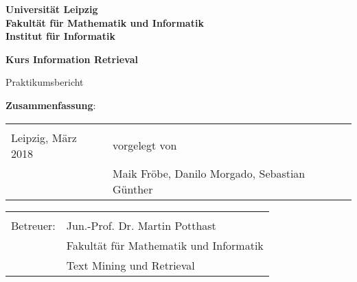 \documentclass[a4paper,ngerman,twoside,BCOR1.5cm,headsepline,DIV12,appendixprefix,final,12pt]{scrartcl}
\begin{document}
\thispagestyle{empty}

\begin{center}
\large

\vspace{1cm}
\textbf{\sffamily	Universität Leipzig\\
			Fakultät für Mathematik und Informatik\\
			Institut für Informatik\\}

\vspace{2cm}
{\Large\textbf{\sffamily Kurs Information Retrieval}}


\large

Praktikumsbericht
\vspace{1cm}
\end{center}

\textbf{Zusammenfassung}:\\
\label{sec:intro}


\vfill

{\large
\begin{tabular}{p{7cm} l}
&\\
\small
Leipzig, März 2018 		& \small vorgelegt von\\
				& \small Maik Fröbe, Danilo Morgado, Sebastian Günther\\
\end{tabular}}

\begin{tabular}{p{7cm} l}
&\\
\small
Betreuer: 	& \small Jun.-Prof. Dr. Martin Potthast \\
				& \small Fakultät für Mathematik und Informatik\\
				& \small Text Mining und Retrieval
\end{tabular}


\newpage


\newpage


\newpage


\newpage


\newpage
{}


\end{document}
